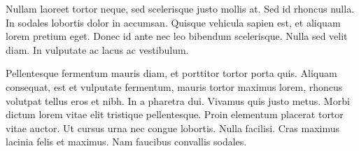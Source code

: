 Nullam laoreet tortor neque, sed scelerisque justo mollis at. Sed id rhoncus nulla. In sodales lobortis dolor in accumsan. Quisque vehicula sapien est, et aliquam lorem pretium eget. Donec id ante nec leo bibendum scelerisque. Nulla sed velit diam. In vulputate ac lacus ac vestibulum.

Pellentesque fermentum mauris diam, et porttitor tortor porta quis. Aliquam consequat, est et vulputate fermentum, mauris tortor maximus lorem, rhoncus volutpat tellus eros et nibh. In a pharetra dui. Vivamus quis justo metus. Morbi dictum lorem vitae elit tristique pellentesque. Proin elementum placerat tortor vitae auctor. Ut cursus urna nec congue lobortis. Nulla facilisi. Cras maximus lacinia felis et maximus. Nam faucibus convallis sodales. 
